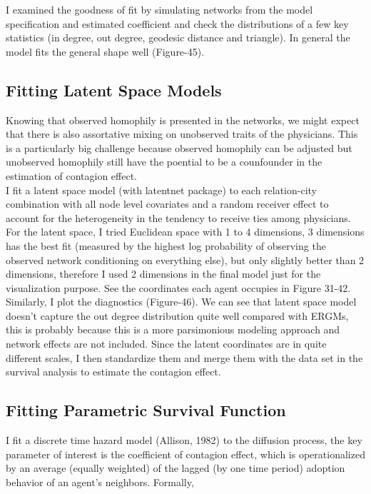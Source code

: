 \documentclass[11pt]{article}
\begin{document}
I examined the goodness of fit by simulating networks from the model specification and estimated coefficient and check the distributions of a few key statistics (in degree, out degree, geodesic distance and triangle). In general the model fits the general shape well (Figure-45).\\


\subsection{Fitting Latent Space Models}
Knowing that observed homophily is presented in the networks, we might expect that there is also assortative mixing on unobserved traits of the physicians. This is a particularly big challenge because observed homophily can be adjusted but unobserved homophily still have the poential to be a counfounder in the estimation of contagion effect.\\

I fit a latent space model (with latentnet package) to each relation-city combination with all node level covariates and a random receiver effect to account for the heterogeneity in the tendency to receive ties among physicians. For the latent space, I tried Euclidean space with 1 to 4 dimensions, 3 dimensions has the best fit (measured by the highest log probability of observing the observed network conditioning on everything else), but only slightly better than 2 dimensions, therefore I used 2 dimensions in the final model just for the visualization purpose. See the coordinates each agent occupies in Figure 31-42.\\

Similarly, I plot the diagnostics (Figure-46). We can see that latent space model doesn't capture the out degree distribution quite well compared with ERGMs, this is probably because this is a more parsimonious modeling approach and network effects are not included. Since the latent coordinates are in quite different scales, I then standardize them and merge them with the data set in the survival analysis to estimate the contagion effect.
\\

\subsection{Fitting Parametric Survival Function}
I fit a discrete time hazard model (Allison, 1982) to the diffusion process, the key parameter of interest is the coefficient of contagion effect, which is operationalized by an average (equally weighted) of the lagged (by one time period) adoption behavior of an agent's neighbors. Formally,\\
\end{document}

